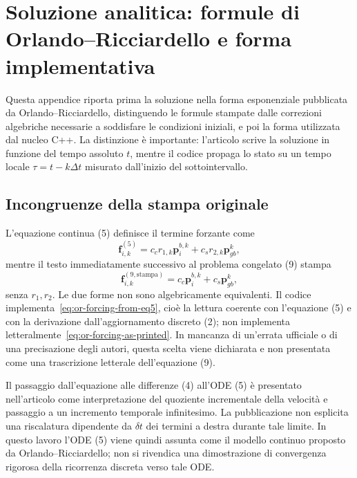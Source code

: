 \section{Soluzione analitica: formule di Orlando--Ricciardello e forma implementativa}
\label{app:propagator}

Questa appendice riporta prima la soluzione nella forma esponenziale pubblicata da Orlando--Ricciardello, distinguendo le formule stampate dalle correzioni algebriche necessarie a soddisfare le condizioni iniziali, e poi la forma utilizzata dal nucleo C++. La distinzione è importante: l'articolo scrive la soluzione in funzione del tempo assoluto $t$, mentre il codice propaga lo stato su un tempo locale $\tau=t-k\Delta t$ misurato dall'inizio del sottointervallo.

\subsection{Incongruenze della stampa originale}

L'equazione continua (5) definisce il termine forzante come
\begin{equation}
 \boldsymbol f_{i,k}^{(5)}
 =c_c r_{1,k}\boldsymbol p_i^{b,k}
  +c_s r_{2,k}\boldsymbol p_{gb}^{k},
 \label{eq:or-forcing-from-eq5}
\end{equation}
mentre il testo immediatamente successivo al problema congelato (9) stampa
\begin{equation}
 \boldsymbol f_{i,k}^{(9,\mathrm{stampa})}
 =c_c\boldsymbol p_i^{b,k}+c_s\boldsymbol p_{gb}^{k},
 \label{eq:or-forcing-as-printed}
\end{equation}
senza $r_1,r_2$. Le due forme non sono algebricamente equivalenti. Il codice implementa~\eqref{eq:or-forcing-from-eq5}, cioè la lettura coerente con l'equazione (5) e con la derivazione dall'aggiornamento discreto (2); non implementa letteralmente~\eqref{eq:or-forcing-as-printed}. In mancanza di un'errata ufficiale o di una precisazione degli autori, questa scelta viene dichiarata e non presentata come una trascrizione letterale dell'equazione (9).

Il passaggio dall'equazione alle differenze (4) all'ODE (5) è presentato nell'articolo come interpretazione del quoziente incrementale della velocità e passaggio a un incremento temporale infinitesimo. La pubblicazione non esplicita una riscalatura dipendente da $\delta t$ dei termini a destra durante tale limite. In questo lavoro l'ODE (5) viene quindi assunta come il modello continuo proposto da Orlando--Ricciardello; non si rivendica una dimostrazione di convergenza rigorosa della ricorrenza discreta verso tale ODE.

